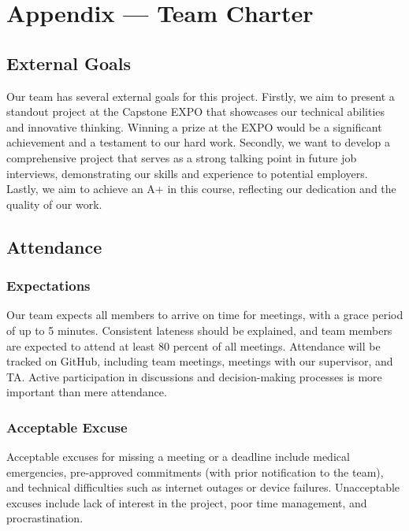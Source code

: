 \documentclass{article}
\begin{document}
\newpage{}

\section*{Appendix --- Team Charter}

\subsection*{External Goals}

Our team has several external goals for this project. Firstly, we aim to present a standout project at the Capstone EXPO that showcases our technical abilities and innovative thinking. Winning a prize at the EXPO would be a significant achievement and a testament to our hard work. Secondly, we want to develop a comprehensive project that serves as a strong talking point in future job interviews, demonstrating our skills and experience to potential employers. Lastly, we aim to achieve an A+ in this course, reflecting our dedication and the quality of our work.

\subsection*{Attendance}

\subsubsection*{Expectations}

Our team expects all members to arrive on time for meetings, with a grace period of up to 5 minutes. Consistent lateness should be explained, and team members are expected to attend at least 80 percent of all meetings. Attendance will be tracked on GitHub, including team meetings, meetings with our supervisor, and TA. Active participation in discussions and decision-making processes is more important than mere attendance.

\subsubsection*{Acceptable Excuse}

Acceptable excuses for missing a meeting or a deadline include medical emergencies, pre-approved commitments (with prior notification to the team), and technical difficulties such as internet outages or device failures. Unacceptable excuses include lack of interest in the project, poor time management, and procrastination.
\end{document}
